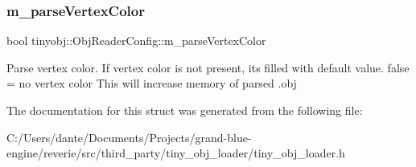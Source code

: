 \subsubsection{\texorpdfstring{m\_parseVertexColor}{m\_parseVertexColor}}
{\footnotesize\ttfamily bool tinyobj\+::\+Obj\+Reader\+Config\+::m\+\_\+parse\+Vertex\+Color}

Parse vertex color. If vertex color is not present, its filled with default value. false = no vertex color This will increase memory of parsed .obj 

The documentation for this struct was generated from the following file\+:\begin{DoxyCompactItemize}
\item 
C\+:/\+Users/dante/\+Documents/\+Projects/grand-\/blue-\/engine/reverie/src/third\+\_\+party/tiny\+\_\+obj\+\_\+loader/tiny\+\_\+obj\+\_\+loader.\+h\end{DoxyCompactItemize}
